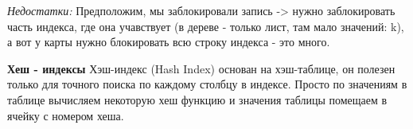 \textit{Недостатки:} Предположим, мы заблокировали запись -> нужно заблокировать часть индекса, где она учавствует (в дереве - только лист, там мало значений: k), а вот у карты нужно блокировать всю строку индекса - это много.


\textbf{Хеш - индексы} 
Хэш-индекс (Hash Index) основан на хэш-таблице, он полезен только для точного поиска по каждому столбцу в индексе. Просто по значениям в таблице вычисляем некоторую хеш функцию и значения таблицы помещаем в ячейку с номером хеша. 

